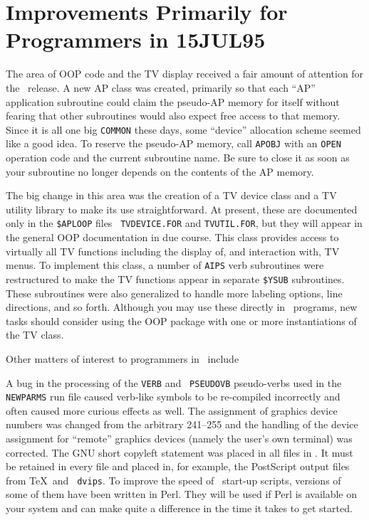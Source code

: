 \section{Improvements Primarily for Programmers in 15JUL95}

The area of OOP code and the TV display received a fair amount of
attention for the \RELEASENAME\ release.  A new AP class was created,
primarily so that each ``AP'' application subroutine could claim the
pseudo-AP memory for itself without fearing that other subroutines
would also expect free access to that memory.  Since it is all one big
{\tt COMMON} these days, some ``device'' allocation scheme seemed like
a good idea.  To reserve the pseudo-AP memory, call {\tt APOBJ} with
an {\tt OPEN} operation code and the current subroutine name.  Be sure
to close it as soon as your subroutine no longer depends on the
contents of the AP memory.

The big change in this area was the creation of a TV device class and
a TV utility library to make its use straightforward.  At present,
these are documented only in the {\tt \$APLOOP} files {\tt
TVDEVICE.FOR} and {\tt TVUTIL.FOR}, but they will appear in the
general OOP documentation in due course.  This class provides access
to virtually all TV functions including the display of, and interaction
with, TV menus.  To implement this class, a number of {\tt AIPS} verb
subroutines were restructured to make the TV functions appear in
separate {\tt \$YSUB} subroutines.  These subroutines were also
generalized to handle more labeling options, line directions, and so
forth.  Although you may use these directly in \AIPS\ programs, new
tasks should consider using the OOP package with one or more
instantiations of the TV class.

Other matters of interest to programmers in \RELEASENAME\ include
\vspace{-10pt}
\begin{description}
 A bug in the processing of the {\tt VERB} and {\tt
    PSEUDOVB} pseudo-verbs used in the {\tt NEWPARMS} run file caused
    verb-like symbols to be re-compiled incorrectly and often caused
    more curious effects as well.
 The assignment of graphics device numbers was changed
    from the arbitrary 241--255 and the handling of the device
    assignment for ``remote'' graphics devices (namely the user's own
    terminal) was corrected.
 The GNU short copyleft statement was placed in all files
    in \hbox{\AIPS}.  It must be retained in every file and placed in,
    for example, the PostScript output files from \TeX\ and {\tt
    dvips}.
 To improve the speed of \AIPS\ start-up scripts,
    versions of some of them have been written in Perl.  They will be
    used if Perl is available on your system and can make quite a
    difference in the time it takes to get started.
\end{description}
\vfill\eject

